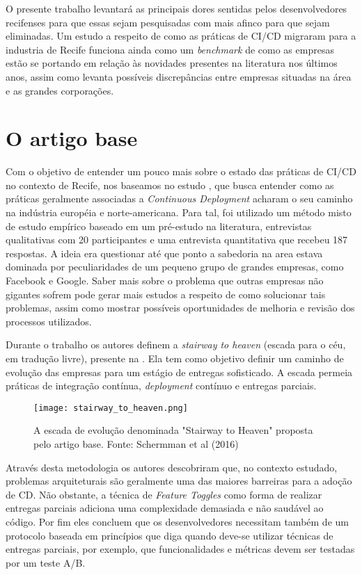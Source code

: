 O presente trabalho levantará as principais dores sentidas pelos desenvolvedores recifenses para que essas sejam pesquisadas com mais afinco para que sejam eliminadas. Um estudo a respeito de como as práticas de CI/CD migraram para a industria de Recife funciona ainda como um \emph{benchmark} de como as empresas estão se portando em relação às novidades presentes na literatura nos últimos anos, assim como levanta possíveis discrepâncias entre empresas situadas na área e as grandes corporações. 


\section{O artigo base}
Com o objetivo de entender um pouco mais sobre o estado das práticas de CI/CD no contexto de Recife, nos baseamos no estudo \cite{empiricalStudy2016}, que busca entender como as práticas geralmente associadas a \emph{Continuous Deployment} acharam o seu caminho na indústria européia e norte-americana. Para tal, foi utilizado um método misto de estudo empírico baseado em um pré-estudo na literatura, entrevistas qualitativas com 20 participantes e uma entrevista quantitativa que recebeu 187 respostas. A ideia era questionar até que ponto a sabedoria na area estava dominada por peculiaridades de um pequeno grupo de grandes empresas, como Facebook e Google. Saber mais sobre o problema que outras empresas não gigantes sofrem pode gerar mais estudos a respeito de como solucionar tais problemas, assim como mostrar possíveis oportunidades de melhoria e revisão dos processos utilizados.

Durante o trabalho os autores definem a \emph{stairway to heaven} (escada para o céu, em tradução livre), presente na . Ela tem como objetivo definir um caminho de evolução das empresas para um estágio de entregas sofisticado. A escada permeia práticas de integração contínua, \emph{deployment} contínuo e entregas parciais.

\begin{figure}[ht]
\begin{center}
\texttt{[image: stairway\_to\_heaven.png]}
\end{center}
\caption[Stairway to Heaven]{
    A escada de evolução denominada "Stairway to Heaven" proposta pelo artigo base.
    Fonte: Schermman et al (2016)
}\label{stairway}

\end{figure}

Através desta metodologia os autores descobriram que, no contexto estudado, problemas arquiteturais são geralmente uma das maiores barreiras para a adoção de CD. Não obstante, a técnica de \emph{Feature Toggles} como forma de realizar entregas parciais adiciona uma complexidade demasiada e não saudável ao código. Por fim eles concluem que os desenvolvedores necessitam também de um protocolo baseada em princípios que diga quando deve-se utilizar técnicas de entregas parciais, por exemplo, que funcionalidades e métricas devem ser testadas por um teste A/B.

